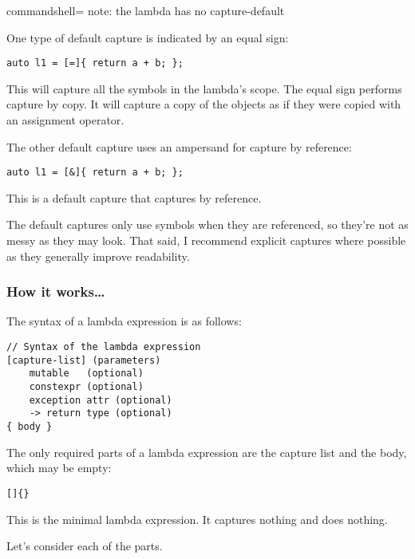 \begin{itemize}
\begin{tcblisting}{commandshell={}}
note: the lambda has no capture-default
\end{tcblisting}

One type of default capture is indicated by an equal sign:

\begin{lstlisting}[style=styleCXX]
auto l1 = [=]{ return a + b; };
\end{lstlisting}

This will capture all the symbols in the lambda's scope. The equal sign performs capture by copy. It will capture a copy of the objects as if they were copied with an assignment operator.

The other default capture uses an ampersand for capture by reference:

\begin{lstlisting}[style=styleCXX]
auto l1 = [&]{ return a + b; };
\end{lstlisting}

This is a default capture that captures by reference.

The default captures only use symbols when they are referenced, so they're not as messy as they may look. That said, I recommend explicit captures where possible as they generally improve readability.

\end{itemize}

\subsubsection{How it works…}

The syntax of a lambda expression is as follows:

\begin{lstlisting}[style=styleCXX]
// Syntax of the lambda expression
[capture-list] (parameters)
	mutable   (optional)
	constexpr (optional)
	exception attr (optional)
	-> return type (optional)
{ body }
\end{lstlisting}

The only required parts of a lambda expression are the capture list and the body, which may be empty:

\begin{lstlisting}[style=styleCXX]
[]{}
\end{lstlisting}

This is the minimal lambda expression. It captures nothing and does nothing.

Let's consider each of the parts.

